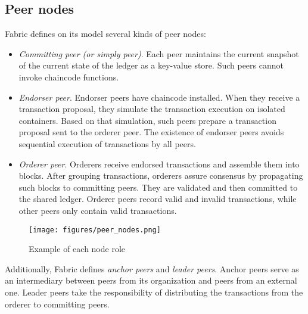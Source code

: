 \documentclass[12pt,a4paper]{article}
\theoremstyle{definition}
\begin{document}
\subsection{Peer nodes}
Fabric defines on its model several kinds of peer nodes:
\begin{itemize}
\item \emph{Committing peer (or simply peer)}. Each peer maintains the current snapshot of the current state of the ledger as a key-value store. Such peers cannot invoke chaincode functions.
\item \emph{Endorser peer}. Endorser peers have chaincode installed. When they receive a transaction proposal, they simulate the transaction execution on isolated containers. Based on that simulation, such peers prepare a transaction proposal sent to the orderer peer. The existence of endorser peers avoids sequential execution of transactions by all peers.
\item \emph{Orderer peer}. Orderers receive endorsed transactions and assemble them into blocks. After grouping transactions, orderers assure consensus by propagating such blocks to committing peers. They are validated and then committed to the shared ledger. Orderer peers record valid and invalid transactions, while other peers only contain valid transactions.

\end{itemize}

\begin{figure}[h]

\texttt{[image: figures/peer\_nodes.png]}
\centering
\caption{Example of each node role \cite{peer_nodes}}
\label{fig:hf}
\end{figure}

Additionally, Fabric defines \emph{anchor peers} and \emph{leader peers}. Anchor peers serve as an intermediary between peers from its organization and peers from an external one. Leader peers take the responsibility of distributing the transactions from the orderer to committing peers.
\end{document}
